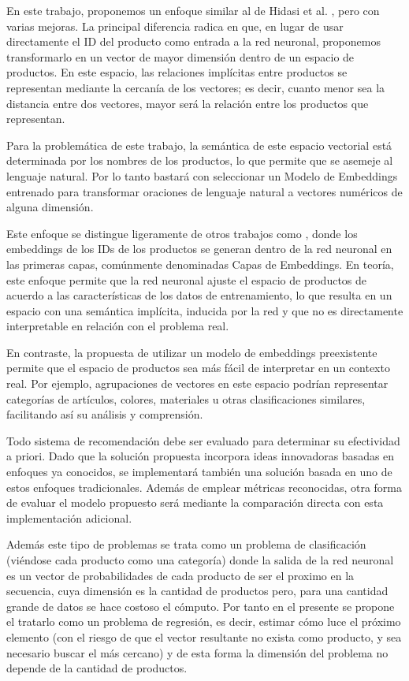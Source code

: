 \documentclass[runningheads]{llncs}
\begin{document}
En este trabajo, proponemos un enfoque similar al de Hidasi et al. \cite{hidasi2016session}, pero con varias mejoras. La principal diferencia radica en que, en lugar de usar directamente el ID del producto como entrada a la red neuronal, proponemos transformarlo en un vector de mayor dimensión dentro de un espacio de productos. En este espacio, las relaciones implícitas entre productos se representan mediante la cercanía de los vectores; es decir, cuanto menor sea la distancia entre dos vectores, mayor será la relación entre los productos que representan.

Para la problemática de este trabajo, la semántica de este espacio vectorial está determinada por los nombres de los productos, lo que permite que se asemeje al lenguaje natural. Por lo tanto bastará con seleccionar un Modelo de Embeddings entrenado para transformar oraciones de lenguaje natural a vectores numéricos de alguna dimensión.

Este enfoque se distingue ligeramente de otros trabajos como \cite{chung2014empirical,tang2018personalized}, donde los embeddings de los IDs de los productos se generan dentro de la red neuronal en las primeras capas, comúnmente denominadas Capas de Embeddings. En teoría, este enfoque permite que la red neuronal ajuste el espacio de productos de acuerdo a las características de los datos de entrenamiento, lo que resulta en un espacio con una semántica implícita, inducida por la red y que no es directamente interpretable en relación con el problema real.

En contraste, la propuesta de utilizar un modelo de embeddings preexistente permite que el espacio de productos sea más fácil de interpretar en un contexto real. Por ejemplo, agrupaciones de vectores en este espacio podrían representar categorías de artículos, colores, materiales u otras clasificaciones similares, facilitando así su análisis y comprensión.

Todo sistema de recomendación debe ser evaluado para determinar su efectividad a priori. Dado que la solución propuesta incorpora ideas innovadoras basadas en enfoques ya conocidos, se implementará también una solución basada en uno de estos enfoques tradicionales. Además de emplear métricas reconocidas, otra forma de evaluar el modelo propuesto será mediante la comparación directa con esta implementación adicional.

Además este tipo de problemas se trata como un problema de clasificación (viéndose cada producto como una categoría) donde la salida de la red neuronal es un vector de probabilidades de cada producto de ser el proximo en la secuencia, cuya dimensión es la cantidad de productos pero, para una cantidad grande de datos se hace costoso el cómputo. Por tanto en el presente se propone el tratarlo como un problema de regresión, es decir, estimar cómo luce el próximo elemento (con el riesgo de que el vector resultante no exista como producto, y sea necesario buscar el más cercano) y de esta forma la dimensión del problema no depende de la cantidad de productos.
\end{document}
